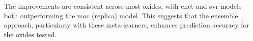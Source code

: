 The improvements are consistent across most oxides, with \gls{enet} and \gls{svr} models both outperforming the \gls{moc} (replica) model. This suggests that the ensemble approach, particularly with these meta-learners, enhances prediction accuracy for the oxides tested.







\begin{figure}
    \centering
\end{figure}
